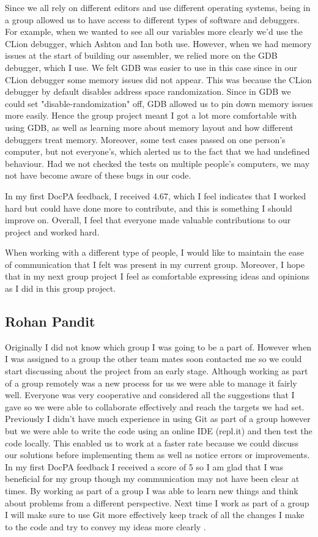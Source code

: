 \documentclass[11pt]{article}
\begin{document}
Since we all rely on different editors and use different operating systems, being in a group allowed us to have access to different types of software and debuggers. For example, when we wanted to see all our variables more clearly we'd use the CLion debugger, which Ashton and Ian both use. However, when we had memory issues at the start of building our assembler, we relied more on the GDB debugger, which I use. We felt GDB was easier to use in this case since in our CLion debugger some memory issues did not appear. This was because the CLion debugger by default disables address space randomization. Since in GDB we could set "disable-randomization" off, GDB allowed us to pin down memory issues more easily. Hence the group project meant I got a lot more comfortable with using GDB, as well as learning more about memory layout and how different debuggers treat memory. Moreover, some test cases passed on one person's computer, but not everyone's, which alerted us to the fact that we had undefined behaviour. Had we not checked the tests on multiple people's computers, we may not have become aware of these bugs in our code.

In my first DocPA feedback, I received 4.67, which I feel indicates that I worked hard but could have done more to contribute, and this is something I should improve on. Overall, I feel that everyone made valuable contributions to our project and worked hard. 

When working with a different type of people, I would like to maintain the ease of communication that I felt was present in my current group. Moreover, I hope that in my next group project I feel as comfortable expressing ideas and opinions as I did in this group project.


\subsection*{Rohan Pandit}
Originally I did not know which group I was going to be a part of. However when I was assigned to a group the other team mates soon contacted me so we could start discussing about the project from an early stage. Although working as part of a group remotely was a new process for us we were able to manage it fairly well. Everyone was very cooperative and considered all the suggestions that I gave so we were able to collaborate effectively and reach the targets we had set. Previously I didn't have much experience in using Git as part of a group however but we were able to write the code using an online IDE (repl.it) and then test the code locally. This enabled us to work at a faster rate because we could discuss our solutions before implementing them as well as notice errors or improvements.
In my first DocPA feedback I received a score of 5 so I am glad that I was beneficial for my group though my communication may not have been clear at times. By working as part of a group I was able to learn new things and think about problems from a different perspective.
Next time I work as part of a group I will make sure to use Git more effectively keep track of all the changes I make to the code and try to convey my ideas more clearly .  
\end{document}
